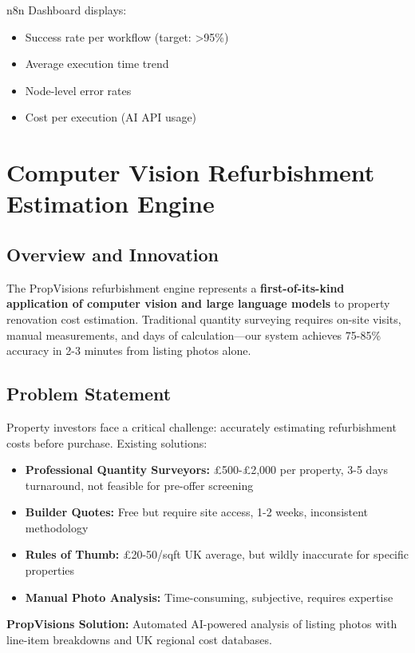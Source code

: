 \documentclass[11pt,a4paper]{article}
\begin{document}
n8n Dashboard displays:
\begin{itemize}
  \item Success rate per workflow (target: \textgreater 95\%)
  \item Average execution time trend
  \item Node-level error rates
  \item Cost per execution (AI API usage)
\end{itemize}

\section{Computer Vision Refurbishment Estimation Engine}

\subsection{Overview and Innovation}

The PropVisions refurbishment engine represents a \textbf{first-of-its-kind application of computer vision and large language models} to property renovation cost estimation. Traditional quantity surveying requires on-site visits, manual measurements, and days of calculation—our system achieves 75-85\% accuracy in 2-3 minutes from listing photos alone.

\subsection{Problem Statement}

Property investors face a critical challenge: accurately estimating refurbishment costs before purchase. Existing solutions:

\begin{itemize}
  \item \textbf{Professional Quantity Surveyors:} £500-£2,000 per property, 3-5 days turnaround, not feasible for pre-offer screening
  \item \textbf{Builder Quotes:} Free but require site access, 1-2 weeks, inconsistent methodology
  \item \textbf{Rules of Thumb:} £20-50/sqft UK average, but wildly inaccurate for specific properties
  \item \textbf{Manual Photo Analysis:} Time-consuming, subjective, requires expertise
\end{itemize}

\textbf{PropVisions Solution:} Automated AI-powered analysis of listing photos with line-item breakdowns and UK regional cost databases.
\end{document}
